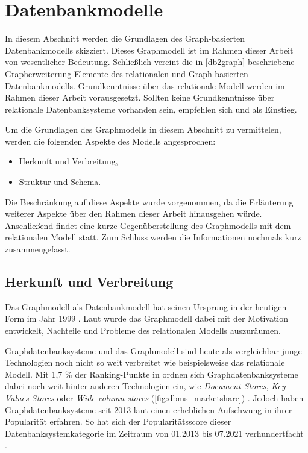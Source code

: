 \section{Datenbankmodelle}
\label{datenmodelle}
In diesem Abschnitt werden die Grundlagen des Graph-basierten Datenbankmodells skizziert. Dieses Graphmodell ist im Rahmen dieser Arbeit von wesentlicher Bedeutung. Schließlich vereint die in \autoref{db2graph} beschriebene Grapherweiterung Elemente des relationalen und Graph-basierten Datenbankmodells. Grundkenntnisse über das relationale Modell werden im Rahmen dieser Arbeit vorausgesetzt. Sollten keine Grundkenntnisse über relationale Datenbanksysteme vorhanden sein, empfehlen sich \cite{rdbms_book} und \cite{codd_relational_model} als Einstieg.

Um die Grundlagen des Graphmodells in diesem Abschnitt zu vermittelen, werden die folgenden Aspekte des Modells angesprochen:
\begin{itemize}
    \item Herkunft und Verbreitung,
    \item Struktur und Schema.
\end{itemize}
Die Beschränkung auf diese Aspekte wurde vorgenommen, da die Erläuterung weiterer Aspekte über den Rahmen dieser Arbeit hinausgehen würde. Anschließend findet eine kurze Gegenüberstellung des Graphmodells mit dem relationalen Modell statt. Zum Schluss werden die Informationen nochmals kurz zusammengefasst. 

\subsection{Herkunft und Verbreitung}
Das Graphmodell als Datenbankmodell hat seinen Ursprung in der heutigen Form im Jahr 1999 \cite{gdbms}. Laut \cite{gdbms} wurde das Graphmodell dabei mit der Motivation entwickelt, Nachteile und Probleme des relationalen Modells auszuräumen. 

Graphdatenbanksysteme und das Graphmodell sind heute als vergleichbar junge Technologien noch nicht so weit verbreitet wie beispielsweise das relationale Modell. Mit 1,7 \% der Ranking-Punkte in \cite{db_engines_ranking_july} ordnen sich Graphdatenbanksysteme dabei noch weit hinter anderen Technologien ein, wie \textit{Document Stores}, \textit{Key-Values Stores} oder \textit{Wide column stores} (\autoref{fig:dbms_marketshare}) \cite{db_engines_ranking_july}. Jedoch haben Graphdatenbanksysteme seit 2013 laut \cite{db_engines_ranking_july} einen erheblichen Aufschwung in ihrer Popularität erfahren. So hat sich der Popularitätsscore dieser Datenbanksystemkategorie im Zeitraum von 01.2013 bis 07.2021 verhundertfacht \cite{db_engines_ranking_july}. 


